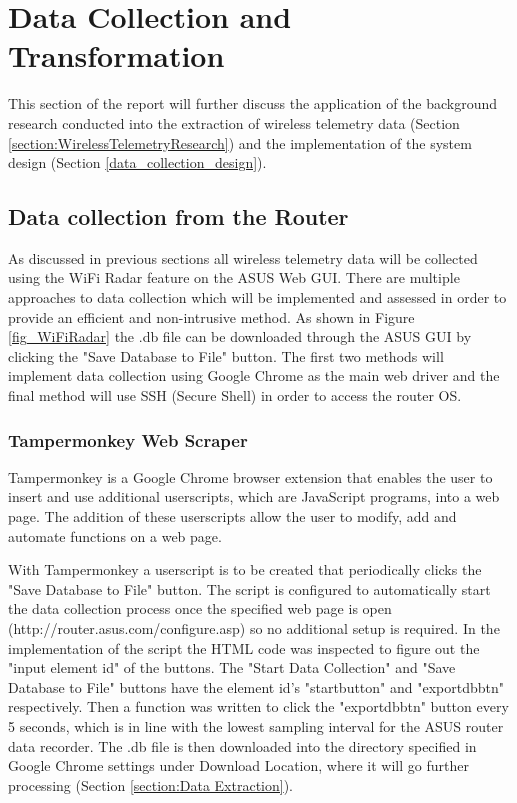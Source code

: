 \section{Data Collection and Transformation}

This section of the report will further discuss the application of the background research conducted into the extraction of wireless telemetry data (Section \ref{section:WirelessTelemetryResearch}) and the implementation of the system design (Section \ref{data_collection_design}). 
\subsection{Data collection from the Router}
\label{Section: Data collection from the Router}

As discussed in previous sections all wireless telemetry data will be collected using the WiFi Radar feature on the ASUS Web GUI. There are multiple approaches to data collection which will be implemented and assessed in order to provide an efficient and non-intrusive method. As shown in Figure \ref{fig_WiFiRadar} the .db file can be downloaded through the ASUS GUI by clicking the "Save Database to File" button. The first two methods will implement data collection using Google Chrome as the main web driver and the final method will use SSH (Secure Shell) in order to access the router OS. 

\subsubsection{Tampermonkey Web Scraper} \label{section:Tampermonkey}

Tampermonkey \cite{tampermonkey} is a Google Chrome browser extension that enables the user to insert and use additional userscripts, which are JavaScript programs, into a web page. The addition of these userscripts allow the user to modify, add and automate functions on a web page. 

With Tampermonkey a userscript is to be created that periodically clicks the "Save Database to File" button. The script is configured to automatically start the data collection process once the specified web page is open (http://router.asus.com/configure.asp) so no additional setup is required. In the implementation of the script the HTML code was inspected to figure out the "input element id" of the buttons. The "Start Data Collection" and "Save Database to File" buttons have the element id's "startbutton" and "exportdbbtn" respectively. Then a function was written to click the "exportdbbtn" button every 5 seconds, which is in line with the lowest sampling interval for the ASUS router data recorder. The .db file is then downloaded into the directory specified in Google Chrome settings under Download Location, where it will go further processing (Section \ref{section:Data Extraction}).

